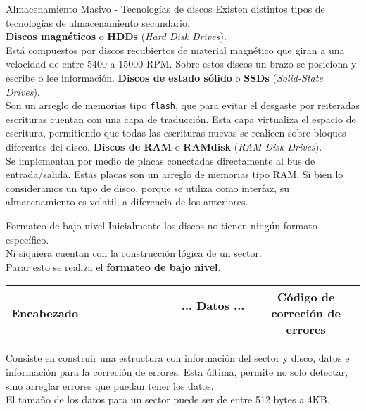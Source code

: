 \documentclass[aspectratio=169]{beamer}
\begin{document}
\begin{frame}{Almacenamiento Masivo - Tecnologías de discos}
    Existen distintos tipos de tecnologías de almacenamiento secundario.\\
    \bigskip
    \textcolor{naranjauca}{\textbf{Discos magnéticos}} o \textcolor{naranjauca}{\textbf{HDDs}} (\textit{Hard Disk Drives}).\\
    Está compuestos por discos recubiertos de material magnético que giran a una velocidad de entre 5400 a 15000 RPM.
    Sobre estos discos un brazo se posiciona y escribe o lee información.
    \bigskip
    \textcolor{naranjauca}{\textbf{Discos de estado sólido}} o \textcolor{naranjauca}{\textbf{SSDs}} (\textit{Solid-State Drives}).\\
    Son un arreglo de memorias tipo \texttt{flash}, que para evitar el desgaste por reiteradas escrituras cuentan con una capa de traducción.
    Esta capa virtualiza el espacio de escritura, permitiendo que todas las escrituras nuevas se realicen sobre bloques diferentes del disco.
    \bigskip
    \textcolor{naranjauca}{\textbf{Discos de RAM}} o \textcolor{naranjauca}{\textbf{RAMdisk}} (\textit{RAM Disk Drives}).\\
    Se implementan por medio de placas conectadas directamente al bus de entrada/salida. Estas placas son un arreglo de memorias tipo RAM.
    Si bien lo consideramos un tipo de disco, porque se utiliza como interfaz, su almacenamiento es volatil, a diferencia de los anteriores.
\end{frame}

\begin{frame}{Formateo de bajo nivel}
    Inicialmente los discos no tienen ningún formato específico.\\
    Ni siquiera cuentan con la construcción lógica de un sector.\\
    Parar esto se realiza el \textbf{formateo de bajo nivel}.\\
    \medskip
    \begin{center}
    \begin{tabular}{|c|c|c|}
    \hline
    Encabezado & \ \ \ \ \ \ \ \ \ \ \ \ \ \ ... Datos ... \ \ \ \ \ \ \ \ \ \ \ \ \ \ & Código de correción de errores\\
    \hline
    \end{tabular}
    \end{center}
    \bigskip
    Consiste en construir una estructura con información del sector y disco, datos e información para la correción de errores.
    Esta última, permite no solo detectar, sino arreglar errores que puedan tener los datos.\\
    \medskip
    \textcolor{verdeuca}{El tamaño de los datos para un sector puede ser de entre 512 bytes a 4KB.\\}
\end{frame}
\end{document}
